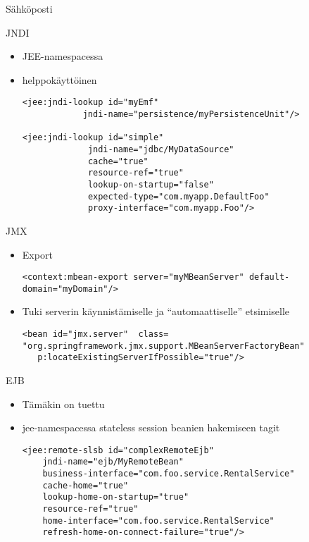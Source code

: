 \documentclass[hyperref={pdfauthor=\AUTHOR},14pt]{beamer}
\begin{document}
\begin{frame}{Sähköposti}
\end{frame}

\begin{frame}[t, fragile]{JNDI}
\begin{itemize}
\item JEE-namespacessa
\item helppokäyttöinen
\begin{lstlisting}
<jee:jndi-lookup id="myEmf"
            jndi-name="persistence/myPersistenceUnit"/>

<jee:jndi-lookup id="simple"
             jndi-name="jdbc/MyDataSource"
             cache="true"
             resource-ref="true"
             lookup-on-startup="false"
             expected-type="com.myapp.DefaultFoo"
             proxy-interface="com.myapp.Foo"/>
\end{lstlisting}
\end{itemize}
\end{frame}

\begin{frame}[t, fragile]{JMX}
\begin{itemize}
\item Export
\begin{lstlisting}
<context:mbean-export server="myMBeanServer" default-domain="myDomain"/>
\end{lstlisting}
\item Tuki serverin käynnistämiselle ja ``automaattiselle''
  etsimiselle
\begin{lstlisting}
<bean id="jmx.server"  class=
"org.springframework.jmx.support.MBeanServerFactoryBean"
   p:locateExistingServerIfPossible="true"/>
\end{lstlisting}

\end{itemize}
\end{frame}

\begin{frame}[t, fragile]{EJB}
\begin{itemize}
\item Tämäkin on tuettu
\item jee-namespacessa stateless session beanien hakemiseen tagit
\begin{lstlisting}
<jee:remote-slsb id="complexRemoteEjb"
    jndi-name="ejb/MyRemoteBean"
    business-interface="com.foo.service.RentalService"
    cache-home="true"
    lookup-home-on-startup="true"
    resource-ref="true"
    home-interface="com.foo.service.RentalService"
    refresh-home-on-connect-failure="true"/>
\end{lstlisting}
\end{itemize}
\end{frame}
\end{document}
